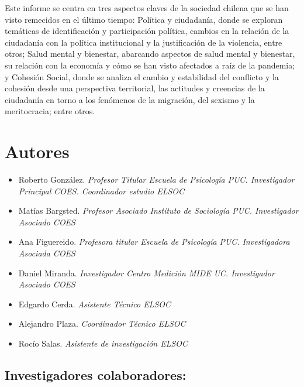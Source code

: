 \documentclass[
  12pt,
]{book}
\providecommand{\tightlist}{%
  \setlength{\itemsep}{0pt}\setlength{\parskip}{0pt}}
\begin{document}
Este informe se centra en tres aspectos claves de la sociedad chilena que se han visto remecidos en el último tiempo: Política y ciudadanía, donde se exploran temáticas de identificación y participación política, cambios en la relación de la ciudadanía con la política institucional y la justificación de la violencia, entre otros; Salud mental y bienestar, abarcando aspectos de salud mental y bienestar, su relación con la economía y cómo se han visto afectados a raíz de la pandemia; y Cohesión Social, donde se analiza el cambio y estabilidad del conflicto y la cohesión desde una perspectiva territorial, las actitudes y creencias de la ciudadanía en torno a los fenómenos de la migración, del sexismo y la meritocracia; entre otros.

\hypertarget{autores}{%
\section*{Autores}\label{autores}}

\begin{itemize}
\tightlist
\item
  Roberto González. \emph{Profesor Titular Escuela de Psicología PUC. Investigador Principal COES. Coordinador estudio ELSOC}
\item
  Matías Bargsted. \emph{Profesor Asociado Instituto de Sociología PUC. Investigador Asociado COES}
\item
  Ana Figuereido. \emph{Profesora titular Escuela de Psicología PUC. Investigadora Asociada COES}
\item
  Daniel Miranda. \emph{Investigador Centro Medición MIDE UC. Investigador Asociado COES}
\item
  Edgardo Cerda. \emph{Asistente Técnico ELSOC}
\item
  Alejandro Plaza. \emph{Coordinador Técnico ELSOC}
\item
  Rocío Salas. \emph{Asistente de investigación ELSOC}
\end{itemize}

\hypertarget{investigadores-colaboradores}{%
\subsection*{Investigadores colaboradores:}\label{investigadores-colaboradores}}
\end{document}
